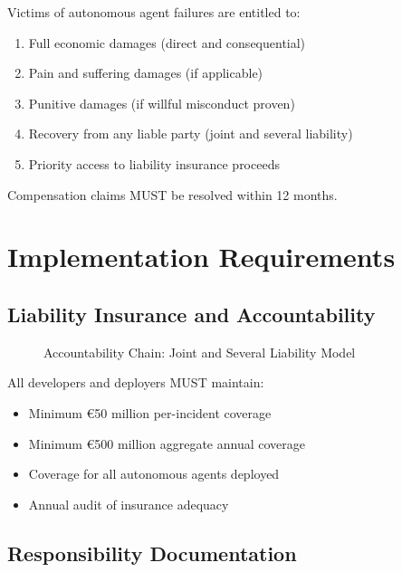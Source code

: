 \begin{articlebox}
Victims of autonomous agent failures are entitled to:
\begin{enumerate}
    \item Full economic damages (direct and consequential)
    \item Pain and suffering damages (if applicable)
    \item Punitive damages (if willful misconduct proven)
    \item Recovery from any liable party (joint and several liability)
    \item Priority access to liability insurance proceeds
\end{enumerate}

Compensation claims MUST be resolved within 12 months.
\end{articlebox}

\vspace{0.5cm}

\section{Implementation Requirements}

\subsection{Liability Insurance and Accountability}

\begin{figure}[h]
\centering

\caption{Accountability Chain: Joint and Several Liability Model}
\label{fig:accountability}
\end{figure}

All developers and deployers MUST maintain:

\begin{itemize}
    \item Minimum €50 million per-incident coverage
    \item Minimum €500 million aggregate annual coverage
    \item Coverage for all autonomous agents deployed
    \item Annual audit of insurance adequacy
\end{itemize}

\subsection{Responsibility Documentation}

